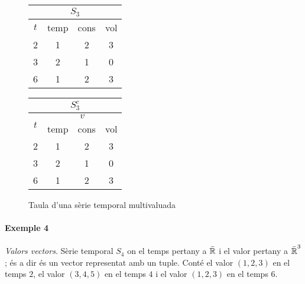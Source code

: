 \begin{figure}[tp]
  \centering
  \begin{tabular}[tp]{|c|c|c|c|}
   \multicolumn{4}{c}{$S_3$} \\ \hline
    $t$  & temp & cons & vol \\ \hline
    2  & 1 & 2 & 3 \\
    3  & 2 & 1 & 0 \\
    6 & 1 & 2 & 3 \\ \hline
  \end{tabular}\qquad
  \begin{tabular}{|c|ccc|}
    \multicolumn{4}{c}{$S_3^c$} \\ \hline
    \multirow{2}{*}{$t$}  & \multicolumn{3}{c|}{$v$} \\ \cline{2-4}
       & temp & cons & vol \\ \hline
    2  & 1 & 2 & 3 \\
    3  & 2 & 1 & 0 \\
    6  & 1 & 2 & 3 \\ \hline
  \end{tabular} 
  \caption{Taula d'una sèrie temporal multivaluada}
  \label{fig:model:serietemporal:multivaluada}
\end{figure}





\paragraph{Exemple 4} \emph{Valors vectors}.  Sèrie temporal $S_4$ on
el temps pertany a $\bar{\mathbb{R}{}}$ i el valor pertany a
$\bar{\mathbb{R}{}}^3$; és a dir és un vector representat amb un
tuple. Conté el valor $(1,2,3)$ en el temps $2$, el valor $(3,4,5)$ en
el temps $4$ i el valor $(1,2,3)$ en el temps $6$.

